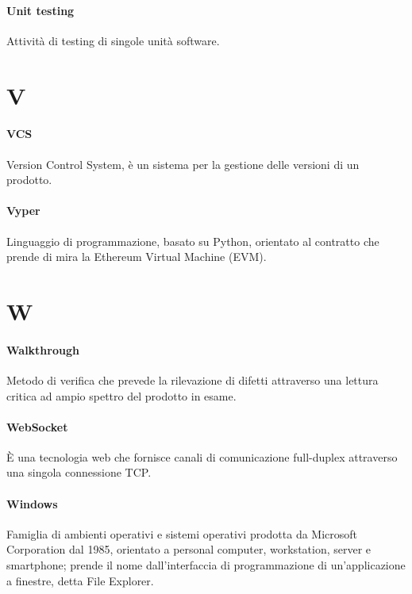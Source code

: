 \documentclass[]{article}
\begin{document}
	\paragraph*{Unit testing}
	Attività di testing di singole unità software.

	\newpage

	\section*{V}

	\paragraph*{VCS}
	Version Control System, è un sistema per la gestione delle versioni di un prodotto.

	\paragraph*{Vyper}
	Linguaggio di programmazione, basato su Python, orientato al contratto che prende di mira la Ethereum Virtual Machine (EVM).

	\newpage

	\section*{W}

	\paragraph*{Walkthrough}
	Metodo di verifica che prevede la rilevazione di difetti attraverso una lettura critica ad ampio spettro del prodotto in esame.

	\paragraph*{WebSocket}
	È una tecnologia web che fornisce canali di comunicazione full-duplex attraverso una singola connessione TCP.

	\paragraph*{Windows}
	Famiglia di ambienti operativi e sistemi operativi prodotta da Microsoft Corporation dal 1985, orientato a personal computer, workstation, server e smartphone; prende il nome dall'interfaccia di programmazione di un'applicazione a finestre, detta File Explorer.
\end{document}
